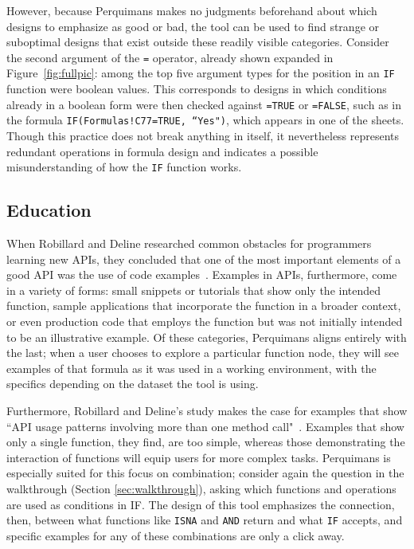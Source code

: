 \documentclass[conference]{IEEEtran}
\newcommand{\toolname}{Perquimans\xspace} \newcommand{\toolnameend}{Perquimans}
\begin{document}
	However, because \toolname makes no judgments beforehand about which designs to
	emphasize as good or bad, the tool can be used to find strange or suboptimal
	designs that exist outside these readily visible categories. Consider the
	second argument of the \texttt{=} operator, already shown expanded in
	Figure~\ref{fig:fullpic}: among the top five argument types for the position in
	an \texttt{IF} function were boolean values. This corresponds to designs in which
	conditions already in a boolean form were then checked against \texttt{=TRUE} or
	\texttt{=FALSE}, such as in the formula \texttt{IF(Formulas!C77=TRUE, ``Yes")}, which
	appears in one of the sheets. Though this practice does not break anything in
	itself, it nevertheless represents redundant operations in formula design and
	indicates a possible misunderstanding of how the \texttt{IF} function works.
	
	\subsection{Education} When Robillard and Deline researched common obstacles
	for programmers learning new APIs, they concluded that one of the most
	important elements of a good API was the use of code examples~\cite{robillard2011field}. Examples in APIs, furthermore, come in
	a variety of forms: small snippets or tutorials that show only the intended
	function, sample applications that incorporate the function in a broader
	context, or even production code that employs the function but was not
	initially intended to be an illustrative example. Of these categories,
	\toolname aligns entirely with the last; when a user chooses to explore a
	particular function node, they will see examples of that formula as it was used
	in a working environment, with the specifics depending on the dataset the tool
	is using. 

	Furthermore, Robillard and Deline's study makes the case for examples that show
	``API usage patterns involving more than one method
	call"~\cite{robillard2011field}. Examples that show only a single function,
	they find, are too simple, whereas those demonstrating the interaction of
	functions will equip users for more complex tasks. \toolname is especially
	suited for this focus on combination; consider again the question in the
	walkthrough (Section \ref{sec:walkthrough}), asking which functions and
	operations are used as conditions in IF. The design of this tool emphasizes the
	connection, then, between what functions like \texttt{ISNA} and \texttt{AND}
	return and what \texttt{IF} accepts, and specific examples for any of these
	combinations are only a click away.
	
\end{document}
